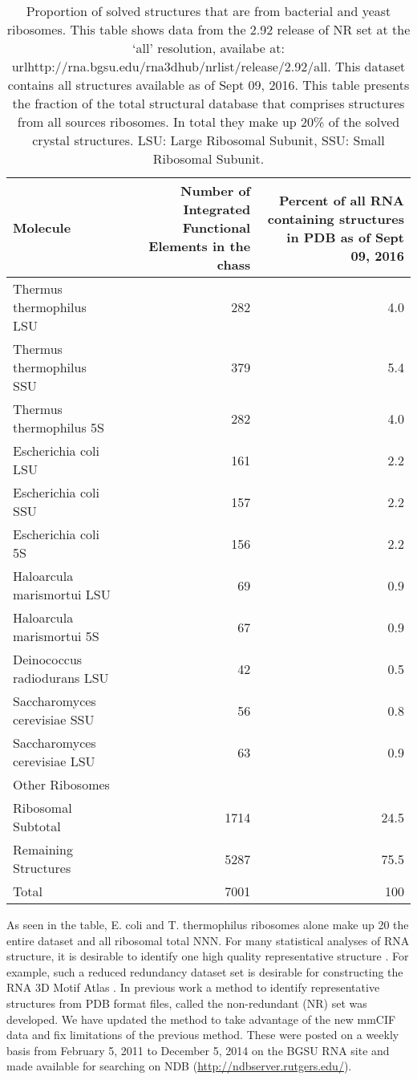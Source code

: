\begin{table}
  \begin{tabular}{lrr}
    \toprule
    Molecule &  Number of Integrated Functional Elements in the chass &  Percent
    of all RNA containing structures in PDB as of Sept 09, 2016 \\
    \midrule
    Thermus thermophilus LSU     & 282  & 4.0 \\
    Thermus thermophilus SSU     & 379  & 5.4 \\
    Thermus thermophilus 5S      & 282  & 4.0 \\
    Escherichia coli LSU         & 161  & 2.2 \\
    Escherichia coli SSU         & 157  & 2.2 \\
    Escherichia coli 5S          & 156  & 2.2 \\
    Haloarcula marismortui LSU   & 69   & 0.9 \\
    Haloarcula marismortui 5S    & 67   & 0.9 \\
    Deinococcus radiodurans LSU  & 42   & 0.5 \\
    Saccharomyces cerevisiae SSU & 56   & 0.8 \\
    Saccharomyces cerevisiae LSU & 63   & 0.9 \\
    Other Ribosomes              &      & \\
    Ribosomal Subtotal           & 1714 & 24.5 \\
    Remaining Structures         & 5287 & 75.5 \\
    Total                        & 7001 & 100 \\
    \bottomrule
  \end{tabular}
  \caption{Proportion of solved structures that are from bacterial and yeast
    ribosomes. This table shows data from the 2.92 release of NR set at the
    ‘all’ resolution, availabe at:
    url{http://rna.bgsu.edu/rna3dhub/nrlist/release/2.92/all}. This dataset contains
    all structures available as of Sept 09, 2016. This table presents the
    fraction of the total structural database that comprises structures from all
    sources ribosomes. In total they make up 20\% of the solved crystal
  structures. LSU: Large Ribosomal Subunit, SSU: Small Ribosomal Subunit.}
  \label{tab:mol-dist}
\end{table}

As seen in the table, E. coli and T. thermophilus ribosomes alone make up 20%
the entire dataset and all ribosomal total NNN. For many statistical analyses of
RNA structure, it is desirable to identify one high quality representative
structure \cite{Leontis2012b}. For example, such a reduced redundancy dataset
set is desirable for constructing the RNA 3D Motif Atlas \cite{Petrov2013}. In
previous work a method to identify representative structures  from PDB format
files, called the non-redundant (NR) set was developed. We have updated the
method to take advantage of the new mmCIF data and fix limitations of the
previous method. These were posted on a weekly basis from February 5, 2011 to
December 5, 2014 on the BGSU RNA site and made available for searching on NDB
(\url{http://ndbserver.rutgers.edu/}). 

